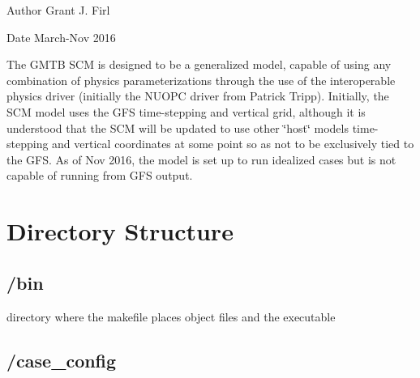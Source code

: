 \begin{DoxyAuthor}{Author}
Grant J. Firl 
\end{DoxyAuthor}
\begin{DoxyDate}{Date}
March-\/\+Nov 2016
\end{DoxyDate}
The G\+M\+TB S\+CM is designed to be a generalized model, capable of using any combination of physics parameterizations through the use of the interoperable physics driver (initially the N\+U\+O\+PC driver from Patrick Tripp). Initially, the S\+CM model uses the G\+FS time-\/stepping and vertical grid, although it is understood that the S\+CM will be updated to use other \char`\"{}host\char`\"{} models\textquotesingle{} time-\/stepping and vertical coordinates at some point so as not to be exclusively tied to the G\+FS. As of Nov 2016, the model is set up to run idealized cases but is not capable of running from G\+FS output.\hypertarget{index_dir_str}{}\section{Directory Structure}\label{index_dir_str}
\hypertarget{index_bin}{}\subsection{/bin}\label{index_bin}

\begin{DoxyItemize}
\item directory where the makefile places object files and the executable 
\end{DoxyItemize}\hypertarget{index_case_config}{}\subsection{/case\+\_\+config}\label{index_case_config}

